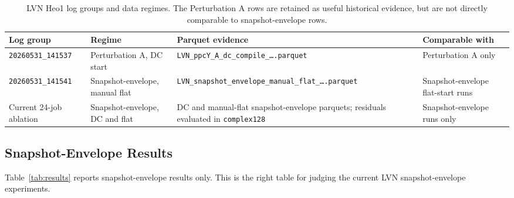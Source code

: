 \documentclass{article}
\begin{document}
\begin{table}[h]
\centering
\caption{LVN Heo1 log groups and data regimes.  The Perturbation A rows are
  retained as useful historical evidence, but are not directly comparable to
  snapshot-envelope rows.}
\label{tab:regimes}
\setlength{\tabcolsep}{4pt}
\small
\begin{tabular}{p{3.1cm}p{2.9cm}p{4.9cm}p{3.8cm}}
\toprule
Log group & Regime & Parquet evidence & Comparable with \\
\midrule
\texttt{20260531\_141537}
  & Perturbation A, DC start
  & \texttt{LVN\_ppcY\_A\_dc\_compile\_\ldots.parquet}
  & Perturbation A only \\
\texttt{20260531\_141541}
  & Snapshot-envelope, manual flat
  & \texttt{LVN\_snapshot\_envelope\_manual\_flat\_\ldots.parquet}
  & Snapshot-envelope flat-start runs \\
Current 24-job ablation
  & Snapshot-envelope, DC and flat
  & DC and manual-flat snapshot-envelope parquets; residuals evaluated in
    \texttt{complex128}
  & Snapshot-envelope runs only \\
\bottomrule
\end{tabular}
\end{table}

\subsection{Snapshot-Envelope Results}

Table~\ref{tab:results} reports snapshot-envelope results only.  This is the
right table for judging the current LVN snapshot-envelope experiments.
\end{document}
